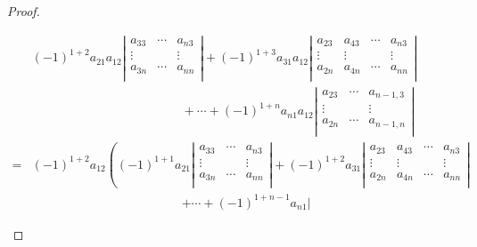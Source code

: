 \begin{proof}
\begin{enumerate}
    $$
    \begin{aligned}
      & (-1)^{1+2}a_{21} a_{12}
      \left|
        \begin{array}{ccc}       
          a_{33} & \cdots & a_{n3} \\
          \vdots  & & \vdots \\
          a_{3n} & \cdots & a_{nn} \\
        \end{array}
      \right| 
      + (-1)^{1+3}a_{31} a_{12}
      \left|
        \begin{array}{cccc}
          a_{23}  & a_{43} & \cdots & a_{n3} \\
          \vdots & \vdots & & \vdots \\
          a_{2n}  & a_{4n} & \cdots & a_{nn} \\
        \end{array}
      \right|  \\
      & \hspace{2in} + \cdots +(-1)^{1+n} a_{n1} a_{12}
      \left|
        \begin{array}{ccc}
          a_{23} & \cdots & a_{n-1,3} \\
          \vdots & & \vdots \\
          a_{2n} & \cdots & a_{n-1,n} \\
        \end{array}
      \right|\\
      = &   (-1)^{1+2} a_{12} \left(
        (-1)^{1+1} a_{21} 
        \left|
          \begin{array}{ccc}       
            a_{33} & \cdots & a_{n3} \\
            \vdots  & & \vdots \\
            a_{3n} & \cdots & a_{nn} \\
          \end{array}
        \right|    
        + (-1)^{1+2}a_{31} 
        \left|
          \begin{array}{cccc}
            a_{23}  & a_{43} & \cdots & a_{n3} \\
            \vdots & \vdots & & \vdots \\
            a_{2n}  & a_{4n} & \cdots & a_{nn} \\
          \end{array}
        \right|\right.\\
      &  \hspace{2in} \left. + \cdots + (-1)^{1+n-1} a_{n1}
        \left|
          \begin{array}{ccc}

\end{array}
\end{aligned}$$
\end{enumerate}
\end{proof}
